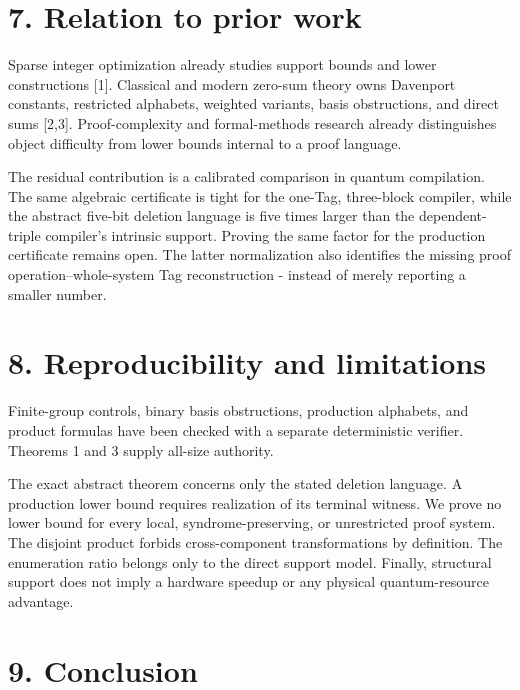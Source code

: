 \documentclass[
  11pt,
]{article}
\begin{document}
\hypertarget{relation-to-prior-work}{%
\section{7. Relation to prior work}\label{relation-to-prior-work}}

Sparse integer optimization already studies support bounds and lower
constructions {[}1{]}. Classical and modern zero-sum theory owns
Davenport constants, restricted alphabets, weighted variants, basis
obstructions, and direct sums {[}2,3{]}. Proof-complexity and
formal-methods research already distinguishes object difficulty from
lower bounds internal to a proof language.

The residual contribution is a calibrated comparison in quantum
compilation. The same algebraic certificate is tight for the one-Tag,
three-block compiler, while the abstract five-bit deletion language is
five times larger than the dependent-triple compiler's intrinsic
support. Proving the same factor for the production certificate remains
open. The latter normalization also identifies the missing proof
operation--whole-system Tag reconstruction - instead of merely reporting
a smaller number.

\hypertarget{reproducibility-and-limitations}{%
\section{8. Reproducibility and
limitations}\label{reproducibility-and-limitations}}

Finite-group controls, binary basis obstructions, production alphabets,
and product formulas have been checked with a separate deterministic
verifier. Theorems 1 and 3 supply all-size authority.

The exact abstract theorem concerns only the stated deletion language. A
production lower bound requires realization of its terminal witness. We
prove no lower bound for every local, syndrome-preserving, or
unrestricted proof system. The disjoint product forbids cross-component
transformations by definition. The enumeration ratio belongs only to the
direct support model. Finally, structural support does not imply a
hardware speedup or any physical quantum-resource advantage.

\hypertarget{conclusion}{%
\section{9. Conclusion}\label{conclusion}}
\end{document}
